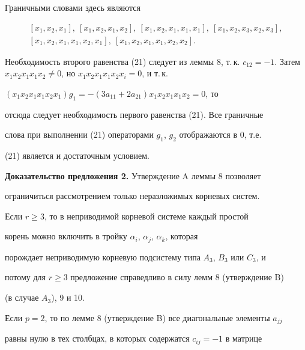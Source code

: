 \begin{pf}


Граничными словами здесь являются


\begin{gather*}


[x_1,x_2,x_1],\ [x_1,x_2,x_1,x_2],\ [x_1,x_2,x_1,x_1,x_1],


\ [x_1,x_2,x_3,x_2,x_3], \\


[x_1,x_2,x_1,x_1,x_2,x_1],\ [x_1,x_2,x_1,x_1,x_2,x_2].


\end{gather*}


Необходимость второго равенства (21) следует из леммы 8, т.\,к. $c_{12}=


-1$. Затем $x_1x_2x_1x_1x_2\ne 0$, но $x_1x_2x_1x_1x_2x_i=0$, и т.\,к.


$(x_1x_2x_1x_1x_2x_1)g_1=-(3a_{11}+2a_{21})x_1x_2x_1x_1x_2=0$, то


отсюда следует необходимость первого равенства (21). Все граничные


слова при выполнении (21) операторами $g_1$, $g_2$ отображаются в 0, т.е.


(21) является и достаточным условием.


\end{pf}





{\bf Доказательство предложения 2.} Утверждение A леммы 8 позволяет


ограничиться рассмотрением только неразложимых корневых систем.





Если $r\ge 3$, то в неприводимой корневой системе каждый простой


корень можно включить в тройку $\alpha_i$, $\alpha_j$, $\alpha_k$, которая


порождает неприводимую корневую подсистему типа $A_3$, $B_3$ или $C_3$, и


потому для $r\ge 3$ предложение справедливо в силу лемм 8 (утверждение B)


(в случае $A_3$), 9 и 10.





Если $p=2$, то по лемме 8 (утверждение B) все диагональные элементы $a_{jj}$


равны нулю в тех столбцах, в которых содержатся $c_{ij}=-1$ в матрице


